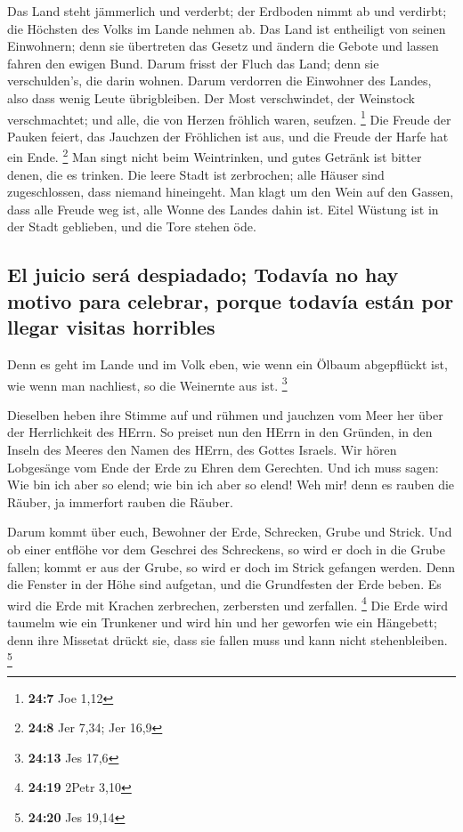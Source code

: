  Das Land steht jämmerlich und verderbt; der Erdboden
nimmt ab und verdirbt; die Höchsten des Volks im Lande nehmen ab.
 Das Land ist entheiligt von seinen Einwohnern; denn sie
übertreten das Gesetz und ändern die Gebote und lassen fahren den ewigen
Bund.  Darum frisst der Fluch das Land; denn sie
verschulden's, die darin wohnen. Darum verdorren die Einwohner des
Landes, also dass wenig Leute übrigbleiben.  Der Most
verschwindet, der Weinstock verschmachtet; und alle, die von Herzen
fröhlich waren, seufzen. \footnote{\textbf{24:7} Joe 1,12}
 Die Freude der Pauken feiert, das Jauchzen der Fröhlichen
ist aus, und die Freude der Harfe hat ein Ende. \footnote{\textbf{24:8}
  Jer 7,34; Jer 16,9}  Man singt nicht beim Weintrinken,
und gutes Getränk ist bitter denen, die es trinken.  Die
leere Stadt ist zerbrochen; alle Häuser sind zugeschlossen, dass niemand
hineingeht.  Man klagt um den Wein auf den Gassen, dass
alle Freude weg ist, alle Wonne des Landes dahin ist. 
Eitel Wüstung ist in der Stadt geblieben, und die Tore stehen öde.

\hypertarget{el-juicio-seruxe1-despiadado-todavuxeda-no-hay-motivo-para-celebrar-porque-todavuxeda-estuxe1n-por-llegar-visitas-horribles}{%
\subsection{El juicio será despiadado; Todavía no hay motivo para
celebrar, porque todavía están por llegar visitas
horribles}\label{el-juicio-seruxe1-despiadado-todavuxeda-no-hay-motivo-para-celebrar-porque-todavuxeda-estuxe1n-por-llegar-visitas-horribles}}

 Denn es geht im Lande und im Volk eben, wie wenn ein
Ölbaum abgepflückt ist, wie wenn man nachliest, so die Weinernte aus
ist. \footnote{\textbf{24:13} Jes 17,6}

 Dieselben heben ihre Stimme auf und rühmen und jauchzen
vom Meer her über der Herrlichkeit des HErrn.  So preiset
nun den HErrn in den Gründen, in den Inseln des Meeres den Namen des
HErrn, des Gottes Israels.  Wir hören Lobgesänge vom Ende
der Erde zu Ehren dem Gerechten. Und ich muss sagen: Wie bin ich aber so
elend; wie bin ich aber so elend! Weh mir! denn es rauben die Räuber, ja
immerfort rauben die Räuber.

 Darum kommt über euch, Bewohner der Erde, Schrecken,
Grube und Strick.  Und ob einer entflöhe vor dem Geschrei
des Schreckens, so wird er doch in die Grube fallen; kommt er aus der
Grube, so wird er doch im Strick gefangen werden. Denn die Fenster in
der Höhe sind aufgetan, und die Grundfesten der Erde beben.
 Es wird die Erde mit Krachen zerbrechen, zerbersten und
zerfallen. \footnote{\textbf{24:19} 2Petr 3,10}  Die Erde
wird taumelm wie ein Trunkener und wird hin und her geworfen wie ein
Hängebett; denn ihre Missetat drückt sie, dass sie fallen muss und kann
nicht stehenbleiben. \footnote{\textbf{24:20} Jes 19,14}

